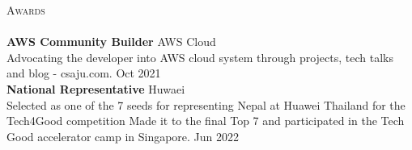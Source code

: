 \documentclass[a4paper]{article}
\newcommand{\lineunder} {
    \vspace*{-8pt} \\
    \hspace*{-18pt} \hrulefill \\
}
\newcommand{\header} [1] {
    {\hspace*{-18pt}\vspace*{6pt} \textsc{#1}}
    \vspace*{-6pt} \lineunder
}
\begin{document}
\header{Awards}
\textbf{AWS Community Builder} \hfill AWS Cloud\\
Advocating the developer into AWS cloud system through projects, tech talks and blog - csaju.com. \hfill Oct 2021\\
\vspace*{2mm}
\textbf{National Representative} \hfill Huwaei\\
Selected as one of the 7 seeds for representing Nepal at Huawei Thailand for the Tech4Good competition Made it to the final Top 7 and participated in the Tech Good accelerator camp in Singapore. \hfill Jun 2022\\
\vspace*{2mm}

\ 
\end{document}
